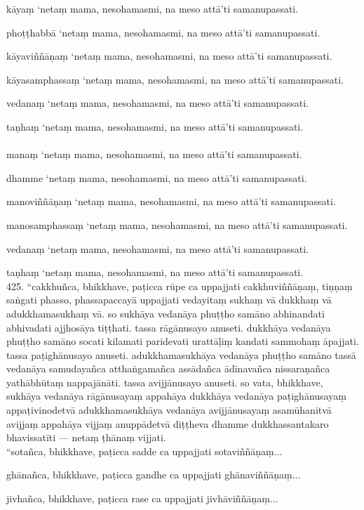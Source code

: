 \documentclass[11pt]{article}
\begin{document}
kāyaṃ ‘netaṃ mama, nesohamasmi, na meso attā’ti samanupassati.\

phoṭṭhabbā ‘netaṃ mama, nesohamasmi, na meso attā’ti samanupassati.\

kāyaviññāṇaṃ ‘netaṃ mama, nesohamasmi, na meso attā’ti samanupassati.\

kāyasamphassaṃ ‘netaṃ mama, nesohamasmi, na meso attā’ti samanupassati.\

vedanaṃ ‘netaṃ mama, nesohamasmi, na meso attā’ti samanupassati.\

taṇhaṃ ‘netaṃ mama, nesohamasmi, na meso attā’ti samanupassati.\\
\pagebreak\\

manaṃ ‘netaṃ mama, nesohamasmi, na meso attā’ti samanupassati.\

dhamme ‘netaṃ mama, nesohamasmi, na meso attā’ti samanupassati.\

manoviññāṇaṃ ‘netaṃ mama, nesohamasmi, na meso attā’ti samanupassati.\

manosamphassaṃ ‘netaṃ mama, nesohamasmi, na meso attā’ti samanupassati.\

vedanaṃ ‘netaṃ mama, nesohamasmi, na meso attā’ti samanupassati.\

taṇhaṃ ‘netaṃ mama, nesohamasmi, na meso attā’ti samanupassati.\\

425. “cakkhuñca, bhikkhave, paṭicca rūpe ca uppajjati cakkhuviññāṇaṃ, tiṇṇaṃ saṅgati phasso, phassapaccayā uppajjati vedayitaṃ sukhaṃ vā dukkhaṃ vā adukkhamasukhaṃ vā. so sukhāya vedanāya phuṭṭho samāno abhinandati abhivadati ajjhosāya tiṭṭhati. tassa rāgānusayo anuseti. dukkhāya vedanāya phuṭṭho samāno socati kilamati paridevati urattāḷiṃ kandati sammohaṃ āpajjati. tassa paṭighānusayo anuseti. adukkhamasukhāya vedanāya phuṭṭho samāno tassā vedanāya samudayañca atthaṅgamañca assādañca ādīnavañca nissaraṇañca yathābhūtaṃ nappajānāti. tassa avijjānusayo anuseti. so vata, bhikkhave, sukhāya vedanāya rāgānusayaṃ appahāya dukkhāya vedanāya paṭighānusayaṃ appaṭivinodetvā adukkhamasukhāya vedanāya avijjānusayaṃ asamūhanitvā avijjaṃ appahāya vijjaṃ anuppādetvā diṭṭheva dhamme dukkhassantakaro bhavissatīti — netaṃ ṭhānaṃ vijjati.\\

“sotañca, bhikkhave, paṭicca sadde ca uppajjati sotaviññāṇaṃ...\

ghānañca, bhikkhave, paṭicca gandhe ca uppajjati ghānaviññāṇaṃ...\

jivhañca, bhikkhave, paṭicca rase ca uppajjati jivhāviññāṇaṃ...\
\end{document}
